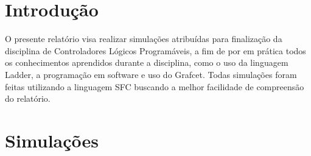 
\section{Introdução}

O presente relatório visa realizar simulações atribuídas para finalização da disciplina de Controladores Lógicos Programáveis, a fim de por em prática todos os conhecimentos aprendidos durante a disciplina, como o uso da linguagem Ladder, a programação em software e uso do Grafcet. Todas simulações foram feitas utilizando a linguagem SFC buscando a melhor facilidade de compreensão do relatório. 

\section{Simulações}

